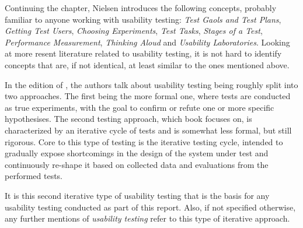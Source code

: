   Continuing the chapter, Nielsen introduces the following concepts, probably
  familiar to anyone working with usability testing:
  \textit{Test Gaols and Test Plans},
  \textit{Getting Test Users},
  \textit{Choosing Experiments},
  \textit{Test Tasks},
  \textit{Stages of a Test},
  \textit{Performance Measurement},
  \textit{Thinking Aloud} and
  \textit{Usability Laboratories}.
  Looking at more resent literature related to usability testing, it is not
  hard to identify concepts that are, if not identical, at least similar to the
  ones mentioned above.

  In the \citeyear{citeHandbookUsability} edition of
  \cite[p. 19]{citeHandbookUsability}, the
  authors talk about usability testing being roughly split into two approaches.
  The first being the more formal one, where tests are conducted as true
  experiments, with the goal to confirm or refute one or more specific
  hypothesises. The second testing approach, which book focuses on, is
  characterized by an iterative cycle of tests and is somewhat less formal, but
  still rigorous. Core to this type of testing is the iterative testing cycle,
  intended to gradually expose shortcomings in the design of the system under
  test and continuously re-shape it based on collected data and evaluations
  from the performed tests.

  It is this second iterative type of usability testing that is the basis for
  any usability testing conducted as part of this report. Also, if not
  specified otherwise, any further mentions of \textit{usability testing}
  refer to this type of iterative approach.






%
%

%
%


